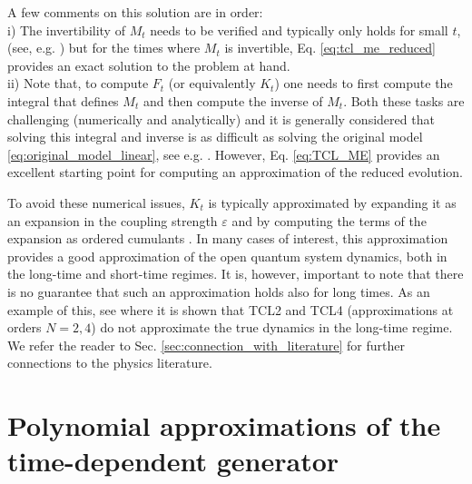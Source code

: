 \documentclass[10pt,aps,pra,twocolumn,showpacs,superscriptaddress,nobalancelastpage,notitlepage,nofootinbib,longbibliography]{revtex4-2}
\begin{document}
A few comments on this solution are in order:\\ 
i) The invertibility of $M_t$ needs to be verified and typically only holds for small $t$, (see, e.g. \cite{breuer2002theory}) but for the times where $M_t$ is invertible, Eq. \eqref{eq:tcl_me_reduced} provides an exact solution to the problem at hand. \\
ii) Note that, to compute $F_t$ (or equivalently $K_t$) one needs to first compute the integral that defines $M_t$ and then compute the inverse of $M_t$. Both these tasks are challenging (numerically and analytically) and it is generally considered that solving this integral and inverse is as difficult as solving the original model \eqref{eq:original_model_linear}, see e.g. \cite{breuer2007}. However, Eq. \eqref{eq:TCL_ME} provides an excellent starting point for computing an approximation of the reduced evolution. 

To avoid these numerical issues, $K_t$ is typically approximated by expanding it as an expansion in the coupling strength $\varepsilon$ and by computing the terms of the expansion as ordered cumulants \cite{breuer2002theory,breuer2006,nestmann2019time}.
In many cases of interest, this approximation provides a good approximation of the open quantum system dynamics, both in the long-time and short-time regimes. It is, however, important to note that there is no guarantee that such an approximation holds also for long times. As an example of this, see \cite{breuer2007} where it is shown that TCL2 and TCL4 (approximations at orders $N=2,4$) do not approximate the true dynamics in the long-time regime.
We refer the reader to Sec. \ref{sec:connection_with_literature} for further connections to the physics literature.

\section{Polynomial approximations of the time-dependent generator}
\label{sec:time_ordered}
\end{document}
